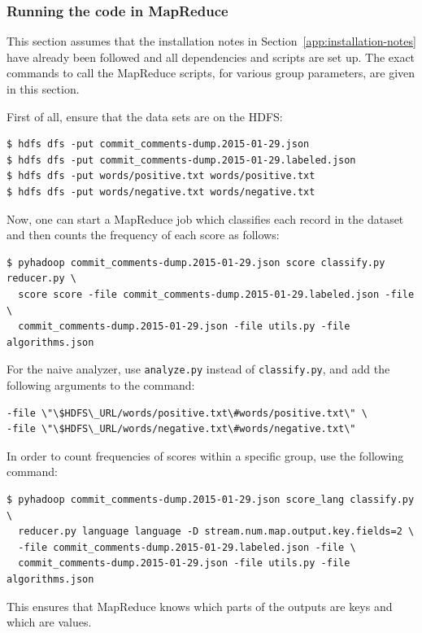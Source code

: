 \documentclass{article}
\begin{document}
\subsubsection{Running the code in MapReduce}\label{app:mapreduce}
This section assumes that the installation notes in 
Section~\ref{app:installation-notes} have already been followed and all 
dependencies and scripts are set up. The exact commands to call the MapReduce 
scripts, for various group parameters, are given in this section.

First of all, ensure that the data sets are on the HDFS:

\begin{verbatim}
$ hdfs dfs -put commit_comments-dump.2015-01-29.json
$ hdfs dfs -put commit_comments-dump.2015-01-29.labeled.json
$ hdfs dfs -put words/positive.txt words/positive.txt
$ hdfs dfs -put words/negative.txt words/negative.txt
\end{verbatim}

Now, one can start a MapReduce job which classifies each record in the dataset 
and then counts the frequency of each score as follows:

\begin{verbatim}
$ pyhadoop commit_comments-dump.2015-01-29.json score classify.py reducer.py \
  score score -file commit_comments-dump.2015-01-29.labeled.json -file \
  commit_comments-dump.2015-01-29.json -file utils.py -file algorithms.json
\end{verbatim}

For the naive analyzer, use \texttt{analyze.py} instead of 
\texttt{classify.py}, and add the following arguments to the 
command:
\begin{verbatim}
-file \"\$HDFS\_URL/words/positive.txt\#words/positive.txt\" \
-file \"\$HDFS\_URL/words/negative.txt\#words/negative.txt\"
\end{verbatim}

In order to count frequencies of scores within a specific group, use the 
following command:

\begin{verbatim}
$ pyhadoop commit_comments-dump.2015-01-29.json score_lang classify.py \
  reducer.py language language -D stream.num.map.output.key.fields=2 \
  -file commit_comments-dump.2015-01-29.labeled.json -file \
  commit_comments-dump.2015-01-29.json -file utils.py -file algorithms.json
\end{verbatim}

This ensures that MapReduce knows which parts of the outputs are keys and which 
are values.
\end{document}
